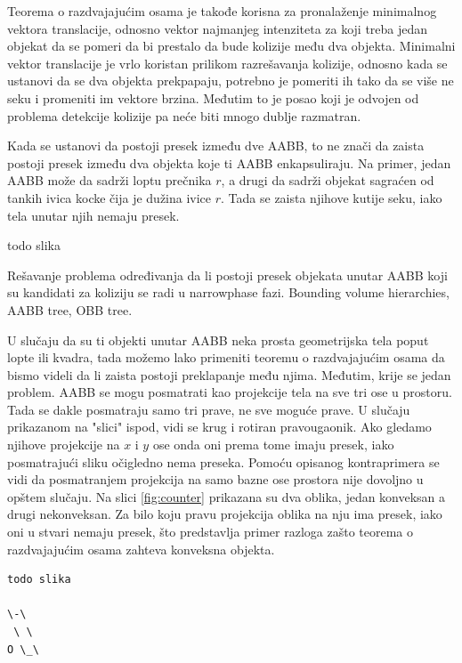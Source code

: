 \documentclass{article}
\begin{document}
{Teorema o razdvajajućim osama je takođe korisna za pronalaženje minimalnog vektora translacije, odnosno
vektor najmanjeg intenziteta za koji treba jedan objekat da se pomeri da bi prestalo da bude kolizije među dva objekta.
Minimalni vektor translacije je vrlo koristan prilikom razrešavanja kolizije, odnosno kada se ustanovi da
se dva objekta prekpapaju, potrebno je pomeriti ih tako da se više ne seku i promeniti im vektore brzina.
Međutim to je posao koji je odvojen od problema detekcije kolizije pa neće biti mnogo dublje razmatran.

Kada se ustanovi da postoji presek između dve AABB, to ne znači da zaista postoji presek između dva objekta
koje ti AABB enkapsuliraju. Na primer, jedan AABB može da sadrži loptu prečnika $r$, a drugi 
da sadrži objekat sagraćen od tankih ivica kocke čija je dužina ivice $r$. Tada se zaista njihove kutije 
seku, iako tela unutar njih nemaju presek.

todo slika

Rešavanje problema određivanja da li postoji presek objekata unutar AABB koji su kandidati za koliziju 
se radi u narrowphase fazi. Bounding volume hierarchies, AABB tree, OBB tree.


U slučaju da su ti objekti unutar AABB neka prosta geometrijska tela poput
lopte ili kvadra, tada možemo lako primeniti teoremu o razdvajajućim osama da bismo videli da li zaista 
postoji preklapanje među njima. Međutim, krije se jedan problem.
AABB se mogu posmatrati kao projekcije tela na sve tri ose u prostoru.
Tada se dakle posmatraju samo tri prave, ne sve moguće prave. 
U slučaju prikazanom na "slici" ispod, vidi se krug i rotiran pravougaonik. Ako gledamo njihove projekcije 
na $x$ i $y$ ose onda oni prema tome imaju presek, iako posmatrajući sliku očigledno nema preseka.
Pomoću opisanog kontraprimera se vidi da posmatranjem projekcija na samo bazne ose prostora nije dovoljno
u opštem slučaju. Na slici \ref{fig:counter} prikazana su dva oblika, jedan konveksan a drugi nekonveksan. 
Za bilo koju pravu projekcija oblika na nju ima presek, iako oni u stvari nemaju presek, što predstavlja 
primer razloga zašto teorema o razdvajajućim osama zahteva konveksna objekta.

\begin{verbatim}
todo slika

\-\
 \ \
O \_\
\end{verbatim}


}
\end{document}
